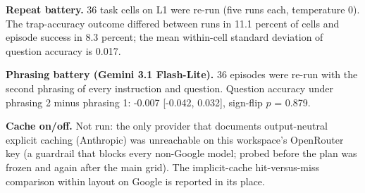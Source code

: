 \textbf{Repeat battery.} 36 task cells on L1 were re-run (five runs each, temperature 0). The trap-accuracy outcome differed between runs in 11.1 percent of cells and episode success in 8.3 percent; the mean within-cell standard deviation of question accuracy is 0.017.

\textbf{Phrasing battery (Gemini 3.1 Flash-Lite).} 36 episodes were re-run with the second phrasing of every instruction and question. Question accuracy under phrasing 2 minus phrasing 1: -0.007 [-0.042, 0.032], sign-flip $p$ = 0.879.

\textbf{Cache on/off.} Not run: the only provider that documents output-neutral explicit caching (Anthropic) was unreachable on this workspace's OpenRouter key (a guardrail that blocks every non-Google model; probed before the plan was frozen and again after the main grid). The implicit-cache hit-versus-miss comparison within layout on Google is reported in its place.
